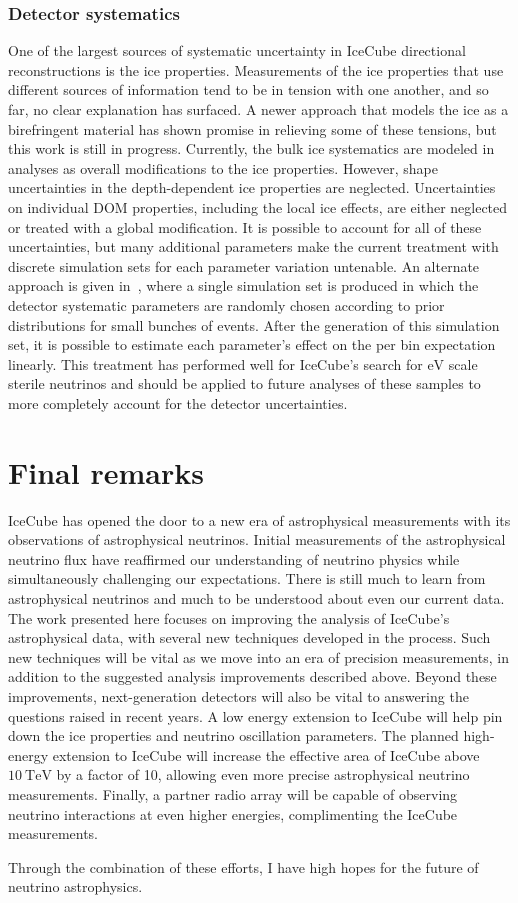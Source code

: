 \subsubsection{Detector systematics}
One of the largest sources of systematic uncertainty in IceCube directional reconstructions is the ice properties.
Measurements of the ice properties that use different sources of information tend to be in tension with one another, and so far, no clear explanation has surfaced.
A newer approach that models the ice as a birefringent material has shown promise in relieving some of these tensions, but this work is still in progress.
Currently, the bulk ice systematics are modeled in analyses as overall modifications to the ice properties.
However, shape uncertainties in the depth-dependent ice properties are neglected.
Uncertainties on individual DOM properties, including the local ice effects, are either neglected or treated with a global modification.
It is possible to account for all of these uncertainties, but many additional parameters make the current treatment with discrete simulation sets for each parameter variation untenable.
An alternate approach is given in~\cite{Aartsen:2019jcj}, where a single simulation set is produced in which the detector systematic parameters are randomly chosen according to prior distributions for small bunches of events.
After the generation of this simulation set, it is possible to estimate each parameter's effect on the per bin expectation linearly.
This treatment has performed well for IceCube's search for $\si\eV$ scale sterile neutrinos and should be applied to future analyses of these samples to more completely account for the detector uncertainties.

\section{Final remarks}
IceCube has opened the door to a new era of astrophysical measurements with its observations of astrophysical neutrinos.
Initial measurements of the astrophysical neutrino flux have reaffirmed our understanding of neutrino physics while simultaneously challenging our expectations.
There is still much to learn from astrophysical neutrinos and much to be understood about even our current data.
The work presented here focuses on improving the analysis of IceCube's astrophysical data, with several new techniques developed in the process.
Such new techniques will be vital as we move into an era of precision measurements, in addition to the suggested analysis improvements described above.
Beyond these improvements, next-generation detectors will also be vital to answering the questions raised in recent years.
A low energy extension to IceCube will help pin down the ice properties and neutrino oscillation parameters.
The planned high-energy extension to IceCube will increase the effective area of IceCube above $\SI{10}\TeV$ by a factor of 10, allowing even more precise astrophysical neutrino measurements.
Finally, a partner radio array will be capable of observing neutrino interactions at even higher energies, complimenting the IceCube measurements.

Through the combination of these efforts, I have high hopes for the future of neutrino astrophysics.
